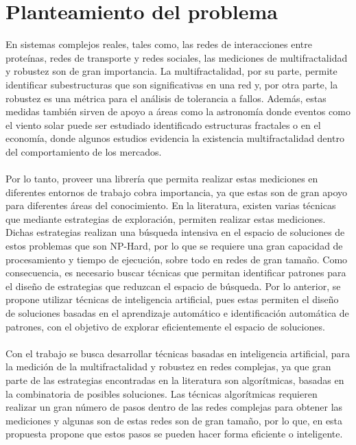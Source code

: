 \section{Planteamiento del problema}
En sistemas complejos reales, tales como, las redes de interacciones entre proteínas, redes de transporte y redes sociales, las mediciones de multifractalidad y robustez son de gran importancia. La multifractalidad, por su parte, permite identificar subestructuras que son significativas en una red\cite{Shuhei2011} y, por otra parte, la robustez es una métrica para el análisis de tolerancia a fallos\cite{Martin-Hernandez2013}. Además, estas medidas también sirven de apoyo a áreas como la astronomía donde eventos como el viento solar puede ser estudiado identificado estructuras fractales\cite{Macek2007} o en el economía, donde algunos estudios evidencia la existencia multifractalidad dentro del comportamiento de los mercados\cite{Caraiani2012}.
\\\\
Por lo tanto, proveer una librería que permita realizar estas mediciones en diferentes entornos de trabajo cobra importancia, ya que estas son de gran apoyo para diferentes áreas del conocimiento. En la literatura, existen varias técnicas que mediante estrategias de exploración, permiten realizar estas mediciones. Dichas estrategias realizan una búsqueda intensiva en el espacio de soluciones de estos problemas que son NP-Hard, por lo que se requiere una gran capacidad de procesamiento y tiempo de ejecución, sobre todo en redes de gran tamaño. Como consecuencia, es necesario buscar técnicas que permitan identificar patrones para el diseño de estrategias que reduzcan el espacio de búsqueda. Por lo anterior, se propone utilizar técnicas de inteligencia artificial, pues estas permiten el diseño de soluciones basadas en el aprendizaje automático e identificación automática de patrones, con el objetivo de explorar eficientemente el espacio de soluciones.
\\\\
Con el trabajo se busca desarrollar técnicas basadas en inteligencia artificial, para la medición de la multifractalidad y robustez en redes complejas, ya que gran parte de las estrategias encontradas en la literatura son algorítmicas, basadas en la combinatoria de posibles soluciones. Las técnicas algorítmicas requieren realizar un gran número de pasos dentro de las redes complejas para obtener las mediciones y algunas son de estas redes son de gran tamaño, por lo que, en esta propuesta propone que estos pasos se pueden hacer forma eficiente o inteligente.

